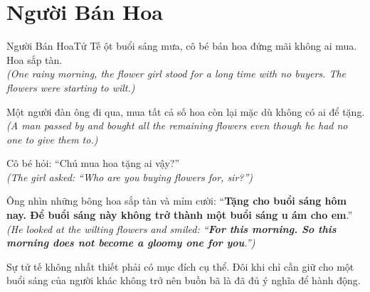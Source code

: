 \section{Người Bán Hoa}
\begin{truyen}{Người Bán Hoa}{Tử Tế}
ột buổi sáng mưa, cô bé bán hoa đứng mãi không ai mua. Hoa sắp tàn.\\
\textit{(One rainy morning, the flower girl stood for a long time with no buyers. The flowers were starting to wilt.)}

Một người đàn ông đi qua, mua tất cả số hoa còn lại mặc dù không có ai để tặng.\\
\textit{(A man passed by and bought all the remaining flowers even though he had no one to give them to.)}

Cô bé hỏi: ``Chú mua hoa tặng ai vậy?''\\
\textit{(The girl asked: ``Who are you buying flowers for, sir?'')}

Ông nhìn những bông hoa sắp tàn và mỉm cười: ``\textbf{Tặng cho buổi sáng hôm nay. Để buổi sáng này không trở thành một buổi sáng u ám cho em}.''\\
\textit{(He looked at the wilting flowers and smiled: ``\textbf{For this morning. So this morning does not become a gloomy one for you}.'')}
\end{truyen}
\begin{baihoc}
  Sự tử tế không nhất thiết phải có mục đích cụ thể. Đôi khi chỉ cần giữ cho một buổi sáng của người khác không trở nên buồn bã là đã đủ ý nghĩa để hành động.
\end{baihoc}


